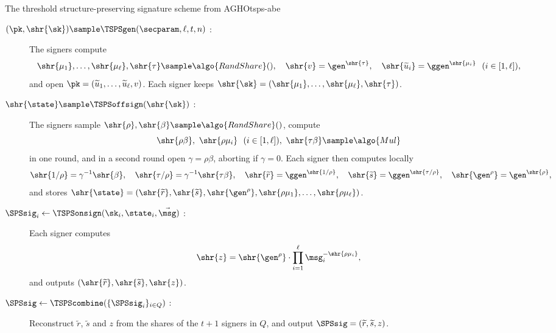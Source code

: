 \begin{protocolbox}{The threshold structure-preserving signature scheme from AGHO}{tsps-abe}

  \begin{description}

    \item[$(\pk, \shr{\sk}) \sample \TSPSgen(\secparam, \ell, t, n)$ :] The
signers compute
      \begin{equation*}
	\shr{\mu_1}, \ldots, \shr{\mu_\ell}, \shr{\tau} \sample
\algo{RandShare}(), \quad \shr{v} = \gen^{\shr{\tau}}, \quad
\shr{\widetilde{u}_i} = \ggen^{\shr{\mu_i}} \ \ (i \in [1,\ell]),
      \end{equation*}
      and open $\pk = (\widetilde{u}_1, \ldots, \widetilde{u}_\ell, v)$. Each
signer keeps $\shr{\sk} = (\shr{\mu_1}, \ldots, \shr{\mu_\ell}, \shr{\tau})$.

    \item[$\shr{\state} \sample \TSPSoffsign(\shr{\sk})$ :] The signers sample
$\shr{\rho}, \shr{\beta} \sample \algo{RandShare}()$, compute
      \begin{equation*}
	\shr{\rho\beta}, \ \shr{\rho\mu_i} \ \ (i \in [1,\ell]), \
\shr{\tau\beta} \sample \algo{Mul}
      \end{equation*}
      in one round, and in a second round open $\gamma = \rho\beta$, aborting if
$\gamma = 0$. Each signer then computes locally
      \begin{equation*}
	\shr{1/\rho} = \gamma^{-1}\shr{\beta}, \quad \shr{\tau/\rho} =
\gamma^{-1}\shr{\tau\beta}, \quad \shr{\widetilde{r}} = \ggen^{\shr{1/\rho}},
\quad \shr{\widetilde{s}} = \ggen^{\shr{\tau/\rho}}, \quad \shr{\gen^{\rho}} =
\gen^{\shr{\rho}},
      \end{equation*}
      and stores $\shr{\state} = (\shr{\widetilde{r}}, \shr{\widetilde{s}},
\shr{\gen^{\rho}}, \shr{\rho\mu_1}, \ldots, \shr{\rho\mu_\ell})$.

    \item[$\SPSsig_i \leftarrow \TSPSonsign(\sk_i, \state_i, \vec{\msg})$ :]
Each signer computes
      \begin{equation*}
	\shr{z} = \shr{\gen^{\rho}} \cdot \prod_{i=1}^\ell
\msg_i^{-\shr{\rho\mu_i}},
      \end{equation*}
      and outputs $(\shr{\widetilde{r}}, \shr{\widetilde{s}}, \shr{z})$.

    \item[$\SPSsig \leftarrow \TSPScombine(\{\SPSsig_i\}_{i \in Q})$ :]
Reconstruct $\widetilde{r}$, $\widetilde{s}$ and $z$ from the shares of the $t+1$
signers in $Q$, and output $\SPSsig = (\widetilde{r}, \widetilde{s}, z)$.


\end{description}
\end{protocolbox}
